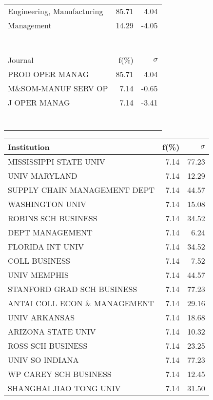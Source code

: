 \documentclass[a4paper,11pt]{report}
\begin{document}
\begin{landscape}
\begin{table}[!ht]
{\begin{tabular}{|l r  r|}
Engineering, Manufacturing & 85.71 & 4.04\\
Management & 14.29 & -4.05\\
 &  & \\
 &  & \\
 &  & \\
 &  & \\
 &  & \\
 &  & \\
 &  & \\
\hline
\hline
Journal & f(\%) & $\sigma$\\
\hline
PROD OPER MANAG & 85.71 & 4.04\\
M\&SOM-MANUF SERV OP & 7.14 & -0.65\\
J OPER MANAG & 7.14 & -3.41\\
 &  & \\
 &  & \\
 &  & \\
 &  & \\
 &  & \\
 &  & \\
 &  & \\
\hline
\end{tabular}
}
{\scriptsize\begin{tabular}{|l r r|}
\hline
Institution & f(\%) & $\sigma$\\
\hline
MISSISSIPPI STATE UNIV & 7.14 & 77.23\\
UNIV MARYLAND & 7.14 & 12.29\\
SUPPLY CHAIN MANAGEMENT DEPT & 7.14 & 44.57\\
WASHINGTON UNIV & 7.14 & 15.08\\
ROBINS SCH BUSINESS & 7.14 & 34.52\\
DEPT MANAGEMENT & 7.14 & 6.24\\
FLORIDA INT UNIV & 7.14 & 34.52\\
COLL BUSINESS & 7.14 & 7.52\\
UNIV MEMPHIS & 7.14 & 44.57\\
STANFORD GRAD SCH BUSINESS & 7.14 & 77.23\\
ANTAI COLL ECON \& MANAGEMENT & 7.14 & 29.16\\
UNIV ARKANSAS & 7.14 & 18.68\\
ARIZONA STATE UNIV & 7.14 & 10.32\\
ROSS SCH BUSINESS & 7.14 & 23.25\\
UNIV SO INDIANA & 7.14 & 77.23\\
WP CAREY SCH BUSINESS & 7.14 & 12.45\\
SHANGHAI JIAO TONG UNIV & 7.14 & 31.50\\

\end{tabular}}
\end{table}
\end{landscape}
\end{document}
